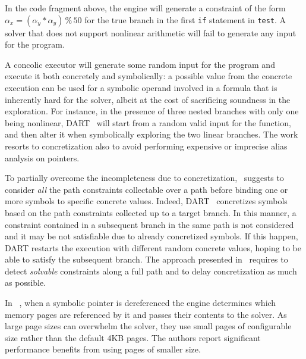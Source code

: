 \noindent In the code fragment above, the engine will generate a constraint of the form $\alpha_x = (\alpha_y*\alpha_y)\,\%\,50$ for the true branch in the first {\tt if} statement in {\tt test}. A solver that does not support nonlinear arithmetic will fail to generate any input for the program.

A concolic executor will generate some random input for the program and execute it both concretely and symbolically: a possible value from the concrete execution can be used for a symbolic operand involved in a formula that is inherently hard for the solver, albeit at the cost of sacrificing soundness in the exploration. For instance, in the presence of three nested branches with only one being nonlinear, {\sc DART}~\cite{DART-PLDI05} will start from a random valid input for the function, and then alter it when symbolically exploring the two linear branches. The work resorts to concretization also to avoid performing expensive or imprecise alias analysis on pointers. %

To partially overcome the incompleteness due to concretization,~\cite{PRV-ISSTA11} suggests to consider {\em all} the path constraints collectable over a path before binding one or more symbols to specific concrete values. Indeed, {\sc DART}~\cite{DART-PLDI05} concretizes symbols based on the path constraints collected up to a target branch. In this manner, a constraint contained in a subsequent branch in the same path is not considered and it may be not satisfiable due to already concretized symbols. If this happen, {\sc DART} restarts the execution with different random concrete values, hoping to be able to satisfy the subsequent branch. The approach presented in~\cite{PRV-ISSTA11} requires to detect {\em solvable} constraints along a full path and to delay concretization as much as possible.

\medskip{}
In {\sc \stwoe}~\cite{CKC-TOCS12}, when a symbolic pointer is dereferenced the engine determines which memory pages are referenced by it and passes their contents to the solver. As large page sizes can overwhelm the solver, they use small pages of configurable size rather than the default 4KB pages. The authors report significant performance benefits from using pages of smaller size.